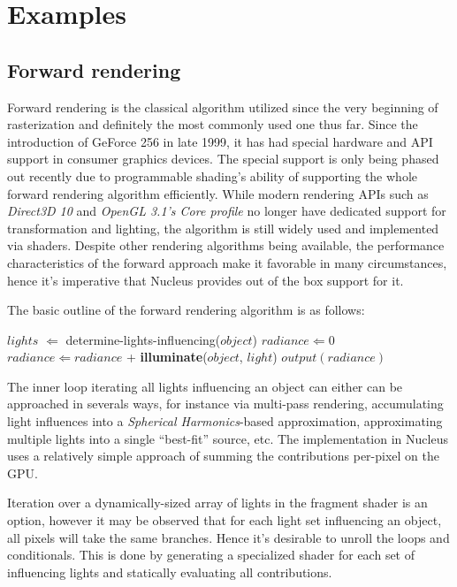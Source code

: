 
\chapter{ Examples }
\label{Chapter6}

\section{Forward rendering}
\label{sec:ForwardRenderingExample}

Forward rendering is the classical algorithm utilized since the very beginning of rasterization and definitely the most commonly used one thus far. Since the introduction of GeForce 256 in late 1999, it has had special hardware and API support in consumer graphics devices. The special support is only being phased out recently due to programmable shading's ability of supporting the whole forward rendering algorithm efficiently. While modern rendering APIs such as \emph{Direct3D 10} and \emph{OpenGL 3.1's Core profile} no longer have dedicated support for transformation and lighting, the algorithm is still widely used and implemented via shaders. Despite other rendering algorithms being available, the performance characteristics of the forward approach make it favorable in many circumstances, hence it's imperative that Nucleus provides out of the box support for it.

The basic outline of the forward rendering algorithm is as follows:
	
\begin{algorithmic}
	\STATE $lights$ $\Leftarrow$ determine-lights-influencing($object$)
	\STATE $radiance \Leftarrow 0$
		\STATE $radiance \Leftarrow radiance$ + \textbf{illuminate}($object$, $light$)
	\ENDFOR
	\STATE $output(radiance)$
\ENDFOR
\end{algorithmic}

The inner loop iterating all lights influencing an object can either can be approached in severals ways, for instance via multi-pass rendering, accumulating light influences into a \emph{Spherical Harmonics}-based approximation, approximating multiple lights into a single ``best-fit'' source, etc. The implementation in Nucleus uses a relatively simple approach of summing the contributions per-pixel on the GPU.

Iteration over a dynamically-sized array of lights in the fragment shader is an option, however it may be observed that for each light set influencing an object, all pixels will take the same branches. Hence it's desirable to unroll the loops and conditionals. This is done by generating a specialized shader for each set of influencing lights and statically evaluating all contributions.

